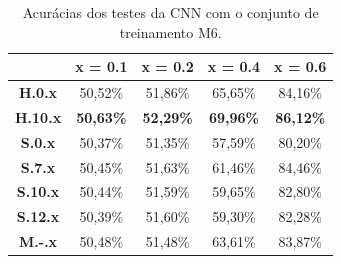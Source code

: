 \begin{table}[!htb]
\centering
\begin{tabular}{c|c|c|c|c|}
\cline{2-5}
\textbf{}                             & \textbf{x = 0.1} & \textbf{x = 0.2} & \textbf{x = 0.4} & \textbf{x = 0.6} \\ \hline
\multicolumn{1}{|c|}{\textbf{H.0.x}}  & 50,52\%          & 51,86\%          & 65,65\%          & 84,16\%          \\ \hline
\multicolumn{1}{|c|}{\textbf{H.10.x}} & \textbf{50,63\%} & \textbf{52,29\%} & \textbf{69,96\%} & \textbf{86,12\%} \\ \hline
\multicolumn{1}{|c|}{\textbf{S.0.x}}  & 50,37\%          & 51,35\%          & 57,59\%          & 80,20\%          \\ \hline
\multicolumn{1}{|c|}{\textbf{S.7.x}}  & 50,45\%          & 51,63\%          & 61,46\%          & 84,46\%          \\ \hline
\multicolumn{1}{|c|}{\textbf{S.10.x}} & 50,44\%          & 51,59\%          & 59,65\%          & 82,80\%          \\ \hline
\multicolumn{1}{|c|}{\textbf{S.12.x}} & 50,39\%          & 51,60\%          & 59,30\%          & 82,28\%          \\ \hline
\multicolumn{1}{|c|}{\textbf{M.-.x}}  & 50,48\%          & 51,48\%          & 63,61\%          & 83,87\%          \\ \hline
\end{tabular}
\caption{Acurácias dos testes da CNN com o conjunto de treinamento M6.}
\label{tab:cnn_m6}
\end{table}


% 
% 
% 

